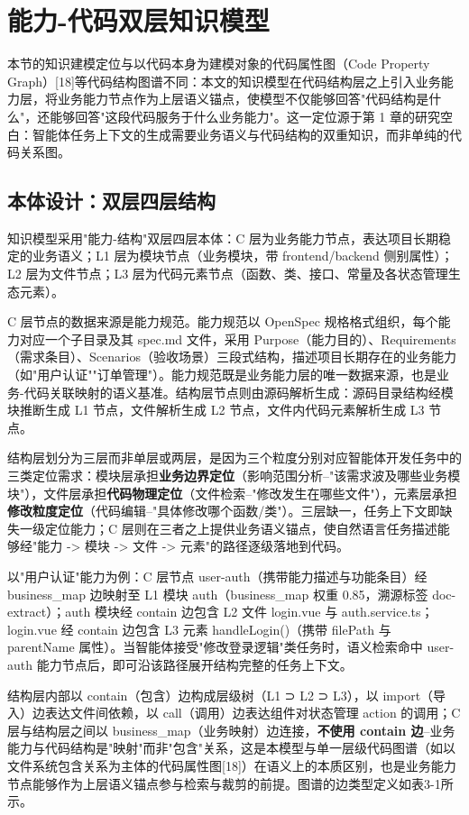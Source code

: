 \section{能力-代码双层知识模型}
本节的知识建模定位与以代码本身为建模对象的代码属性图（Code Property Graph）[18]等代码结构图谱不同：本文的知识模型在代码结构层之上引入业务能力层，将业务能力节点作为上层语义锚点，使模型不仅能够回答"代码结构是什么"，还能够回答"这段代码服务于什么业务能力"。这一定位源于第 1 章的研究空白：智能体任务上下文的生成需要业务语义与代码结构的双重知识，而非单纯的代码关系图。


\subsection{本体设计：双层四层结构}
知识模型采用"能力-结构"双层四层本体：C 层为业务能力节点，表达项目长期稳定的业务语义；L1 层为模块节点（业务模块，带 frontend/backend 侧别属性）；L2 层为文件节点；L3 层为代码元素节点（函数、类、接口、常量及各状态管理生态元素）。

C 层节点的数据来源是能力规范。能力规范以 OpenSpec 规格格式组织，每个能力对应一个子目录及其 spec.md 文件，采用 Purpose（能力目的）、Requirements（需求条目）、Scenarios（验收场景）三段式结构，描述项目长期存在的业务能力（如"用户认证""订单管理"）。能力规范既是业务能力层的唯一数据来源，也是业务-代码关联映射的语义基准。结构层节点则由源码解析生成：源码目录结构经模块推断生成 L1 节点，文件解析生成 L2 节点，文件内代码元素解析生成 L3 节点。

结构层划分为三层而非单层或两层，是因为三个粒度分别对应智能体开发任务中的三类定位需求：模块层承担\textbf{业务边界定位}（影响范围分析--"该需求波及哪些业务模块"），文件层承担\textbf{代码物理定位}（文件检索--"修改发生在哪些文件"），元素层承担\textbf{修改粒度定位}（代码编辑--"具体修改哪个函数/类"）。三层缺一，任务上下文即缺失一级定位能力；C 层则在三者之上提供业务语义锚点，使自然语言任务描述能够经"能力 -> 模块 -> 文件 -> 元素"的路径逐级落地到代码。

以"用户认证"能力为例：C 层节点 user-auth（携带能力描述与功能条目）经 business\_map 边映射至 L1 模块 auth（business\_map 权重 0.85，溯源标签 doc-extract）；auth 模块经 contain 边包含 L2 文件 login.vue 与 auth.service.ts；login.vue 经 contain 边包含 L3 元素 handleLogin()（携带 filePath 与 parentName 属性）。当智能体接受"修改登录逻辑"类任务时，语义检索命中 user-auth 能力节点后，即可沿该路径展开结构完整的任务上下文。

结构层内部以 contain（包含）边构成层级树（L1 ⊃ L2 ⊃ L3），以 import（导入）边表达文件间依赖，以 call（调用）边表达组件对状态管理 action 的调用；C 层与结构层之间以 business\_map（业务映射）边连接，\textbf{不使用 contain 边}--业务能力与代码结构是"映射"而非"包含"关系，这是本模型与单一层级代码图谱（如以文件系统包含关系为主体的代码属性图[18]）在语义上的本质区别，也是业务能力节点能够作为上层语义锚点参与检索与裁剪的前提。图谱的边类型定义如表3-1所示。

